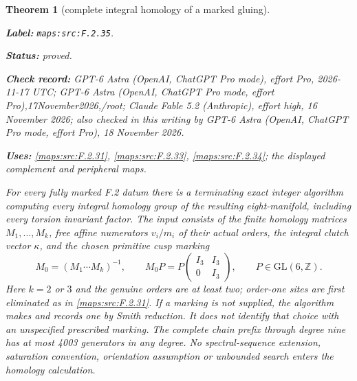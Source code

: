 \documentclass[11pt,a4paper]{article}
\newtheorem{theorem}{Theorem}[section]
\theoremstyle{definition}
\newcommand{\StatementRecord}[4]{\par\smallskip\begingroup\upshape\raggedright\noindent\textbf{Label:} \nolinkurl{#1}.\par\noindent\textbf{Status:} #2.\par\noindent\textbf{Check record:} #3.\par\noindent\textbf{Uses:} #4.\par\endgroup\smallskip}
\newcommand{\CurrentChecker}{GPT-6 Astra (OpenAI, ChatGPT Pro mode, effort Pro), 18 November 2026}
\begin{document}
\begin{theorem}[complete integral homology of a marked gluing]\label{maps:src:F.2.35}
\StatementRecord{maps:src:F.2.35}{proved}{GPT-6 Astra (OpenAI, ChatGPT Pro mode), effort Pro, 2026-11-17 UTC; GPT-6 Astra (OpenAI, ChatGPT Pro mode, effort Pro),17November2026,/root; Claude Fable 5.2 (Anthropic), effort high, 16 November 2026; also checked in this writing by \CurrentChecker}{\cref{maps:src:F.2.31}, \cref{maps:src:F.2.33}, \cref{maps:src:F.2.34}; the displayed complement and peripheral maps}


For every fully marked F.2 datum there is a terminating exact
integer algorithm computing every integral homology group of
the resulting eight-manifold, including every torsion invariant
factor.  The input consists of the finite homology matrices
$M_1,\ldots,M_k$, free affine numerators $v_i/m_i$ of their
actual orders, the integral clutch vector $\kappa$, and the
chosen primitive cusp marking
\[
 M_0=(M_1\cdots M_k)^{-1},\qquad
 M_0P=P\begin{pmatrix}I_3&I_3\\0&I_3\end{pmatrix},
 \qquad P\in\mathrm{GL}(6,\mathbb Z).                       \tag{F.GC1}\label{maps:eq:F.GC1}
\]
Here $k=2$ or $3$ and the genuine orders are at least two;
order-one sites are first eliminated as in \ref{maps:src:F.2.31}.
If a marking is not supplied, the algorithm makes and records
one by Smith reduction.  It does not identify that choice
with an unspecified prescribed marking.
The complete chain prefix through degree nine has at most
4003 generators in any degree.  No spectral-sequence
extension, saturation convention, orientation assumption or
unbounded search enters the homology calculation.

\end{theorem}
\end{document}
